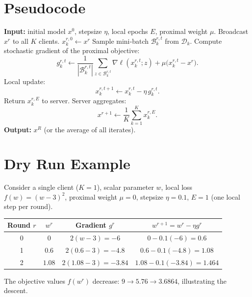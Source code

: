 \documentclass{article}
\begin{document}
\section*{Pseudocode}
\begin{algorithm}[H]
\caption{FedProx Local SGD}
\begin{algorithmic}[1]
\State \textbf{Input:} initial model $x^{0}$, stepsize $\eta$, local epochs $E$, proximal weight $\mu$.
    \State Broadcast $x^{r}$ to all $K$ clients.
        \State $x_{k}^{r,0}\gets x^{r}$
            \State Sample mini‑batch $\mathcal{B}_{k}^{r,t}$ from $\mathcal{D}_k$.
            \State Compute stochastic gradient of the proximal objective:
            \[
                g_{k}^{r,t}\gets \frac{1}{|\mathcal{B}_{k}^{r,t}|}\sum_{z\in\mathcal{B}_{k}^{r,t}}\nabla\ell(x_{k}^{r,t};z)
                +\mu\bigl(x_{k}^{r,t}-x^{r}\bigr).
            \]
            \State Local update:
            \[
                x_{k}^{r,t+1}\gets x_{k}^{r,t}-\eta\,g_{k}^{r,t}.
            \]
        \EndFor
        \State Return $x_{k}^{r,E}$ to server.
    \EndFor
    \State Server aggregates:
    \[
        x^{r+1}\gets \frac{1}{K}\sum_{k=1}^{K}x_{k}^{r,E}.
    \]
\EndFor
\State \textbf{Output:} $x^{R}$ (or the average of all iterates).
\end{algorithmic}
\end{algorithm}

\section*{Dry Run Example}
Consider a single client ($K=1$), scalar parameter $w$, local loss $f(w)=(w-3)^{2}$, proximal weight $\mu=0$, stepsize $\eta=0.1$, $E=1$ (one local step per round).  

\begin{center}
\begin{tabular}{c|c|c|c}
Round $r$ & $w^{r}$ & Gradient $g^{r}$ & $w^{r+1}=w^{r}-\eta g^{r}$\\\hline
0 & $0$ & $2(w-3)=-6$ & $0-0.1(-6)=0.6$\\
1 & $0.6$ & $2(0.6-3)=-4.8$ & $0.6-0.1(-4.8)=1.08$\\
2 & $1.08$ & $2(1.08-3)=-3.84$ & $1.08-0.1(-3.84)=1.464$\\
\end{tabular}
\end{center}
The objective values $f(w^{r})$ decrease: $9\to 5.76\to 3.6864$, illustrating the descent.
\end{document}
